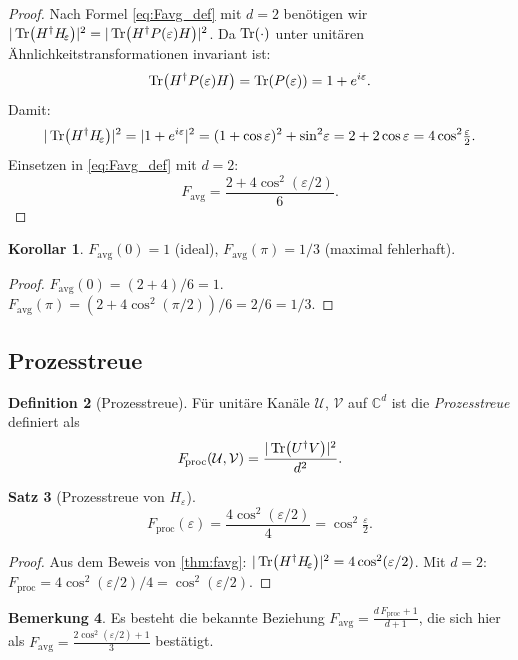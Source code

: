 ﻿\documentclass[11pt,a4paper]{article}
\theoremstyle{definition}
\newtheorem{theorem}{Satz}[section]
\newtheorem{corollary}[theorem]{Korollar}
\newtheorem{definition}[theorem]{Definition}
\newtheorem{remark}[theorem]{Bemerkung}
\newcommand{\eps}{\varepsilon}
\newcommand{\Heps}{H_{\!\varepsilon}}
\newcommand{\Fav}{F_{\!\mathrm{avg}}}
\newcommand{\C}{\mathbb{C}}
\begin{document}
\begin{proof}
  Nach Formel \eqref{eq:Favg_def} mit $d=2$ benötigen wir
  $|\Tr(H^\dagger \Heps)|^2 = |\Tr(H^\dagger P(\eps) H)|^2$.
  Da $\Tr(\cdot)$ unter unitären Ähnlichkeitstransformationen invariant ist:
  \[
    \Tr(H^\dagger P(\eps) H) = \Tr(P(\eps)) = 1 + e^{i\eps}.
  \]
  Damit:
  \[
    |\Tr(H^\dagger\Heps)|^2 = |1 + e^{i\eps}|^2 = (1+\cos\eps)^2 + \sin^2\!\eps
    = 2 + 2\cos\eps = 4\cos^2\!\tfrac{\eps}{2}.
  \]
  Einsetzen in \eqref{eq:Favg_def} mit $d=2$:
  \[
    \Fav = \frac{2 + 4\cos^2(\eps/2)}{6}.
  \]
\end{proof}

\begin{corollary}
  $\Fav(0) = 1$ (ideal), $\Fav(\pi) = 1/3$ (maximal fehlerhaft).
\end{corollary}

\begin{proof}
  $\Fav(0) = (2+4)/6 = 1$. $\Fav(\pi) = (2 + 4\cos^2(\pi/2))/6 = 2/6 = 1/3$.
\end{proof}

\subsection{Prozesstreue}
\label{subsec:proc_fidelity}

\begin{definition}[Prozesstreue]
  Für unitäre Kanäle $\mathcal{U}$, $\mathcal{V}$ auf $\C^d$ ist die
  \emph{Prozesstreue} definiert als
  \begin{equation}
    F_{\!\mathrm{proc}}(\mathcal{U},\mathcal{V})
    = \frac{|\Tr(U^\dagger V)|^2}{d^2}.
    \label{eq:Fproc_def}
  \end{equation}
\end{definition}

\begin{theorem}[Prozesstreue von $\Heps$]
\label{thm:fproc}
  \begin{equation}
    F_{\!\mathrm{proc}}(\eps) = \frac{4\cos^2(\eps/2)}{4} = \cos^2\!\tfrac{\eps}{2}.
    \label{eq:Fproc_result}
  \end{equation}
\end{theorem}

\begin{proof}
  Aus dem Beweis von \cref{thm:favg}: $|\Tr(H^\dagger\Heps)|^2 = 4\cos^2(\eps/2)$.
  Mit $d=2$: $F_{\mathrm{proc}} = 4\cos^2(\eps/2)/4 = \cos^2(\eps/2)$.
\end{proof}

\begin{remark}
  Es besteht die bekannte Beziehung
  $\Fav = \frac{d\,F_{\mathrm{proc}} + 1}{d+1}$, die sich hier
  als $\Fav = \frac{2\cos^2(\eps/2)+1}{3}$ bestätigt.
\end{remark}
\end{document}
